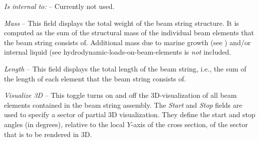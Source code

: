 \begin{bulletlist}
\item{\sl Is internal to:} -- Currently not used.

\item{\sl Mass} --
  This field displays the total weight of the beam string structure.
  It is computed as the sum of the structural mass of the individual beam
  elements that the beam string consists of.
  Additional mass due to marine growth
  (see ) and/or internal liquid
  (see 
  {hydrodynamic-loads-on-beam-elements} is {\sl not} included.


\item{\sl Length} --
  This field displays the total length of the beam string, i.e.,
  the sum of the length of each element that the beam string consists of.

\item{\sl Visualize 3D} --
  This toggle turns on and off the 3D-visualization of all beam elements
  contained in the beam string assembly.
  The {\sl Start} and {\sl Stop} fields are used to specify
  a sector of partial 3D visualization.
  They define the start and stop angles (in degrees), relative to the local
  $Y$-axis of the cross section, of the sector that is to be rendered in 3D.



\end{bulletlist}
